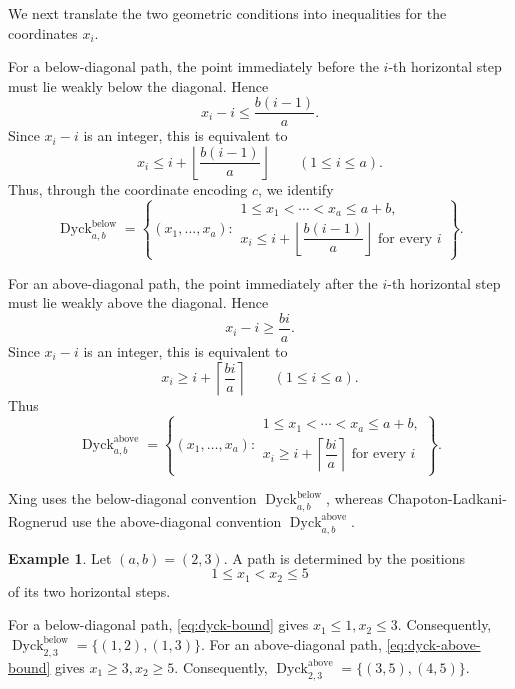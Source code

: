 \documentclass[12pt,a4paper,english,reqno]{amsart}
\theoremstyle{plain}
\theoremstyle{definition}
\newtheorem{exm}[theorem]{Example}
\newcommand{\Dyck}{\operatorname{Dyck}}
\begin{document}
We next translate the two geometric conditions into inequalities for
the coordinates $x_i$.

For a below-diagonal path, the point immediately before the $i$-th
horizontal step must lie weakly below the diagonal. Hence
\[
x_i-i
\leq
\frac{b(i-1)}a.
\]
Since $x_i-i$ is an integer, this is equivalent to
\begin{equation}
x_i
\leq
i+\left\lfloor\frac{b(i-1)}a\right\rfloor
\qquad
(1\leq i\leq a).
\label{eq:dyck-bound}
\end{equation}
Thus, through the coordinate encoding $c$, we identify
\[
\Dyck^{\mathrm{below}}_{a,b}
=
\left\{
(x_1,\ldots,x_a):
\begin{array}{l}
1\leq x_1<\cdots<x_a\leq a+b,\\[2pt]
x_i\leq
i+\left\lfloor\dfrac{b(i-1)}a\right\rfloor
\text{ for every }i
\end{array}
\right\}.
\]

For an above-diagonal path, the point immediately after the $i$-th
horizontal step must lie weakly above the diagonal. Hence
\[
x_i-i
\geq
\frac{bi}{a}.
\]
Since $x_i-i$ is an integer, this is equivalent to
\begin{equation}
x_i
\geq
i+\left\lceil\frac{bi}{a}\right\rceil
\qquad
(1\leq i\leq a).
\label{eq:dyck-above-bound}
\end{equation}
Thus
\[
\Dyck^{\mathrm{above}}_{a,b}
=
\left\{
(x_1,\ldots,x_a):
\begin{array}{l}
1\leq x_1<\cdots<x_a\leq a+b,\\[2pt]
x_i\geq
i+\left\lceil\dfrac{bi}{a}\right\rceil
\text{ for every }i
\end{array}
\right\}.
\]

Xing uses the below-diagonal convention
$\Dyck^{\mathrm{below}}_{a,b}$, whereas
Chapoton-Ladkani-Rognerud use the above-diagonal convention
$\Dyck^{\mathrm{above}}_{a,b}$.

\begin{exm}
Let $(a,b)=(2,3)$. A path is determined by the positions
\[
1\leq x_1<x_2\leq5
\]
of its two horizontal steps.

For a below-diagonal path, \eqref{eq:dyck-bound} gives $x_1\leq1,x_2\leq3$.
Consequently, $\Dyck^{\mathrm{below}}_{2,3}
=\{(1,2),(1,3)\}$.
For an above-diagonal path, \eqref{eq:dyck-above-bound} gives $x_1\geq3,x_2\geq5$.
Consequently, $\Dyck^{\mathrm{above}}_{2,3}=\{(3,5),(4,5)\}$.
\end{exm}
\end{document}

